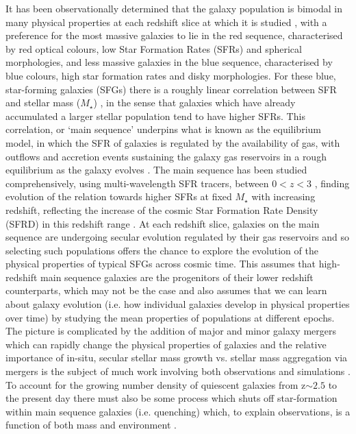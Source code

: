\documentclass[fleqn,usenatbib]{mn2e}
\begin{document}
It has been observationally determined that the galaxy population is bimodal in many physical properties at each redshift slice at which it is studied \citep[e.g. as described in][]{Dekel2006}, with a preference for the most massive galaxies to lie in the red sequence, characterised by red optical colours, low Star Formation Rates (SFRs) and spherical morphologies, and less massive galaxies in the blue sequence, characterised by blue colours, high star formation rates and disky morphologies. 
For these blue, star-forming galaxies (SFGs) there is a roughly linear correlation between SFR and stellar mass ($M_{\star}$) \citep[e.g.][]{Daddi2007,Noeske2007,Elbaz2007}, in the sense that galaxies which have already accumulated a larger stellar population tend to have higher SFRs.
This correlation, or `main sequence' underpins what is known as the equilibrium model, in which the SFR of galaxies is regulated by the availability of gas, with outflows and accretion events sustaining the galaxy gas reservoirs in a rough equilibrium as the galaxy evolves \citep[e.g.][]{Dave2012,Lilly2013,Saintonge2013}.
The main sequence has been studied comprehensively, using multi-wavelength SFR tracers, between $0 < z < 3$ \citep[e.g.][]{Rodighiero2011,Karim2011,Whitaker2012,Behroozi2013b,Whitaker2014,Rodighiero2014,Speagle2014,Pannella2014,Sobral2014,Sparre2015,Lee2015,Schreiber2015,Renzini2015,Nelson2016}, finding evolution of the relation towards higher SFRs at fixed $M_{\star}$ with increasing redshift, reflecting the increase of the cosmic Star Formation Rate Density (SFRD) in this redshift range \citep{Madau_2014}.
At each redshift slice, galaxies on the main sequence are undergoing secular evolution regulated by their gas reservoirs and so selecting such populations offers the chance to explore the evolution of the physical properties of typical SFGs across cosmic time.
This assumes that high-redshift main sequence galaxies are the progenitors of their lower redshift counterparts, which may not be the case \citep[e.g.][]{Gladders2013,Kelson2014,Abramson2016b} and also assumes that we can learn about galaxy evolution (i.e. how individual galaxies develop in physical properties over time) by studying the mean properties of populations at different epochs.
The picture is complicated by the addition of major and minor galaxy mergers which can rapidly change the physical properties of galaxies \citep[e.g.][]{Toomre1977,Lotz2008,Conselice2011,Conselice2014} and the relative importance of in-situ, secular stellar mass growth vs. stellar mass aggregation via mergers is the subject of much work involving both observations and simulations \citep[e.g.][]{Robaina2009,Kaviraj2012,Stott2013,Lofthouse2016,Qu2016}. 
To account for the growing number density of quiescent galaxies from z$\sim 2.5$ to the present day \citep[e.g.][]{Bell2004,Faber2007,Brown2007,Ilbert2010,Brammer2011,Muzzin2013,Buitrago2013} there must also be some process which shuts off star-formation within main sequence galaxies (i.e. quenching) which, to explain observations, is a function of both mass and environment \citep{Peng2010,Darvish2016}.
\end{document}
